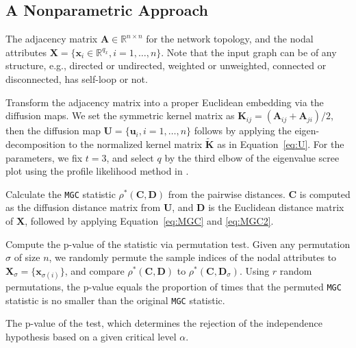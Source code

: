 \documentclass[11pt]{article}
\theoremstyle{definition}
\begin{document}
\subsection{A Nonparametric Approach}
\label{ssec:method}
\begin{description}[align=left]
\item [Input: ]  The adjacency matrix $\mathbf{A} \in \mathbb{R}^{n \times n}$ for the network topology, and the nodal attributes $\mathbf{X}=\{\mathbf{x}_i \in \mathbb{R}^{q_{x}}, i=1,\ldots,n\}$. Note that the input graph can be of any structure, e.g., directed or undirected, weighted or unweighted, connected or disconnected, has self-loop or not. 

\item [Step 1:] Transform the adjacency matrix into a proper Euclidean embedding via the diffusion maps. We set the symmetric kernel matrix as $\mathbf{K}_{ij}=(\mathbf{A}_{ij}+\mathbf{A}_{ji})/2$, then the diffusion map $\mathbf{U}=\{\mathbf{u}_{i},i=1,\ldots,n\}$ follows by applying the eigen-decomposition to the normalized kernel matrix $\mathbf{\widetilde{K}}$ as in Equation~\ref{eq:U}. For the parameters, we fix $t=3$, and select $q$ by the third elbow of the eigenvalue scree plot using the profile likelihood method in \cite{ZhuGhodsi2006}.

\item [Step 2:] Calculate the \texttt{MGC} statistic $\rho^{*}(\mathbf{C}, \mathbf{D})$ from the pairwise distances. $\mathbf{C}$ is computed as the diffusion distance matrix from $\mathbf{U}$, and $\mathbf{D}$ is the Euclidean distance matrix of $\mathbf{X}$, followed by applying Equation~\ref{eq:MGC} and \ref{eq:MGC2}.

\item [Step 3:] Compute the p-value of the statistic via permutation test. Given any permutation $\sigma$ of size $n$, we randomly permute the sample indices of the nodal attributes to $\mathbf{X}_{\sigma}=\{\mathbf{x}_{\sigma(i)}\}$, and compare $\rho^{*}(\mathbf{C}, \mathbf{D})$ to $\rho^{*}(\mathbf{C}, \mathbf{D}_{\sigma})$. Using $r$ random permutations, the p-value equals the proportion of times that the permuted \texttt{MGC} statistic is no smaller than the original \texttt{MGC} statistic. 

\item [Output:] The p-value of the test, which determines the rejection of the independence hypothesis based on a given critical level $\alpha$.
\end{description}
\end{document}
